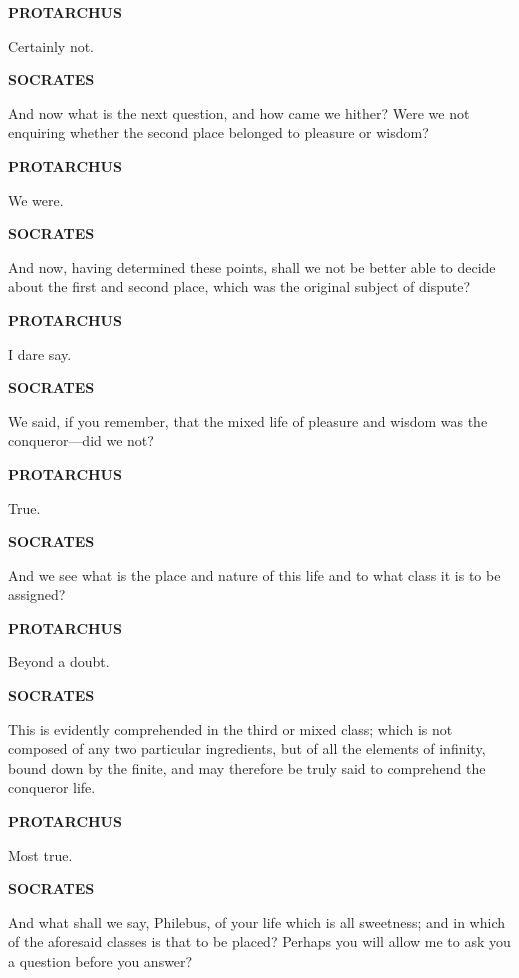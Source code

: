 \documentclass[11pt,letter]{article}
\begin{document}
\par \textbf{PROTARCHUS}
\par   Certainly not.

\par \textbf{SOCRATES}
\par   And now what is the next question, and how came we hither? Were we not enquiring whether the second place belonged to pleasure or wisdom?

\par \textbf{PROTARCHUS}
\par   We were.

\par \textbf{SOCRATES}
\par   And now, having determined these points, shall we not be better able to decide about the first and second place, which was the original subject of dispute?

\par \textbf{PROTARCHUS}
\par   I dare say.

\par \textbf{SOCRATES}
\par   We said, if you remember, that the mixed life of pleasure and wisdom was the conqueror—did we not?

\par \textbf{PROTARCHUS}
\par   True.

\par \textbf{SOCRATES}
\par   And we see what is the place and nature of this life and to what class it is to be assigned?

\par \textbf{PROTARCHUS}
\par   Beyond a doubt.

\par \textbf{SOCRATES}
\par   This is evidently comprehended in the third or mixed class; which is not composed of any two particular ingredients, but of all the elements of infinity, bound down by the finite, and may therefore be truly said to comprehend the conqueror life.

\par \textbf{PROTARCHUS}
\par   Most true.

\par \textbf{SOCRATES}
\par   And what shall we say, Philebus, of your life which is all sweetness; and in which of the aforesaid classes is that to be placed? Perhaps you will allow me to ask you a question before you answer?
\end{document}
